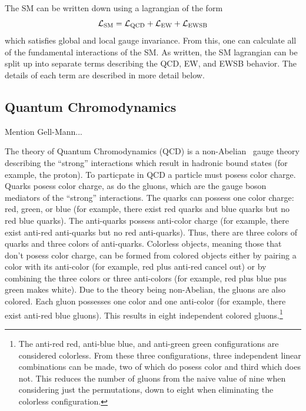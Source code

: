 The SM can be written down using a lagrangian of the form
\begin{equation}
\mathcal{L}_{\textrm{SM}} = \mathcal{L}_{\textrm{QCD}} + \mathcal{L}_{\textrm{EW}} + \mathcal{L}_{\textrm{EWSB}}
\label{eq:lagrangian_sm}
\end{equation}
which satisfies global and local gauge invariance.
From this, one can calculate all of the fundamental interactions of the SM.
As written, the SM lagrangian can be split up into separate terms describing the
QCD, EW, and EWSB behavior. 
The details of each term are described in more detail below.


\subsection{Quantum Chromodynamics}

Mention Gell-Mann...

The theory of Quantum Chromodynamics (QCD) is a non-Abelian
\suthree~gauge theory describing the ``strong'' interactions
which result in hadronic bound states (for example, the proton). 
To particpate in QCD a particle must posess color charge. 
Quarks posess color charge, as do the gluons, which are the gauge boson
mediators of the ``strong'' interactions. The quarks can possess one color charge:
red, green, or blue
(for example, there exist red quarks and blue quarks but no red blue quarks).
The anti-quarks possess anti-color charge (for example, there exist
anti-red anti-quarks but no red anti-quarks). Thus, there are three colors
of quarks and three colors of anti-quarks.  
Colorless objects, meaning those that don't posess color charge, 
can be formed from colored objects either by pairing
a color with its anti-color (for example, red plus anti-red cancel out) or by 
combining the three colors or three anti-colors  (for example,
red plus blue pus green makes white).
Due to the theory being non-Abelian, the gluons are also colored.
Each gluon possesses one
color and one anti-color (for example, there exist anti-red blue gluons).
This results in eight independent 
colored gluons.\footnote{The anti-red red, anti-blue
blue, and anti-green green configurations are considered colorless.
From these three configurations, three 
independent linear combinations can be made, two of which do posess 
color and third
which does not. This reduces the number of gluons from the naive
value of nine when considering just the permutations, down to eight
when eliminating the colorless configuration.}



